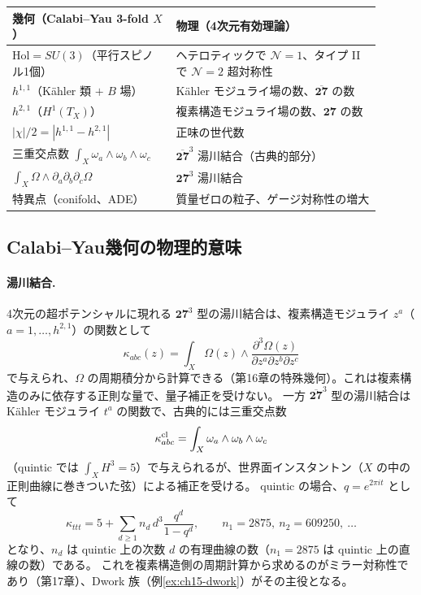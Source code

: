 \begin{physbox}[幾何と物理の辞書]
\begin{center}
\small\renewcommand{\arraystretch}{1.25}
\begin{tabular}{p{0.4\linewidth}|p{0.5\linewidth}}
幾何（Calabi--Yau 3-fold $X$）& 物理（4次元有効理論）\\ \hline
$\mathrm{Hol} = SU(3)$（平行スピノル1個）& ヘテロティックで $\mathcal N=1$、タイプ II で $\mathcal N=2$ 超対称性\\
$h^{1,1}$（K\"ahler 類 $+$ $B$ 場）& K\"ahler モジュライ場の数、$\overline{\mathbf{27}}$ の数\\
$h^{2,1}$（$H^1(T_X)$）& 複素構造モジュライ場の数、$\mathbf{27}$ の数\\
$|\chi|/2 = |h^{1,1}-h^{2,1}|$ & 正味の世代数\\
三重交点数 $\int_X\omega_a\wedge\omega_b\wedge\omega_c$ & $\overline{\mathbf{27}}^3$ 湯川結合（古典的部分）\\
$\int_X\Omega\wedge\partial_a\partial_b\partial_c\Omega$ & $\mathbf{27}^3$ 湯川結合\\
特異点（conifold、ADE）& 質量ゼロの粒子、ゲージ対称性の増大\\
\end{tabular}
\end{center}
\end{physbox}

\subsection{Calabi--Yau幾何の物理的意味}

\paragraph{湯川結合.}
4次元の超ポテンシャルに現れる $\mathbf{27}^3$ 型の湯川結合は、複素構造モジュライ $z^a$（$a=1,\dots,h^{2,1}$）の関数として
\[
\kappa_{abc}(z) = \int_X\Omega(z)\wedge\frac{\partial^3\Omega(z)}{\partial z^a\partial z^b\partial z^c}
\]
で与えられ、$\Omega$ の周期積分から計算できる（第16章の特殊幾何）。これは複素構造のみに依存する正則な量で、量子補正を受けない。
一方 $\overline{\mathbf{27}}^3$ 型の湯川結合は K\"ahler モジュライ $t^a$ の関数で、古典的には三重交点数
\[
\kappa_{abc}^{\rm cl} = \int_X\omega_a\wedge\omega_b\wedge\omega_c
\]
（quintic では $\int_XH^3 = 5$）で与えられるが、世界面インスタントン（$X$ の中の正則曲線に巻きついた弦）による補正を受ける。
quintic の場合、$q = e^{2\pi it}$ として
\[
\kappa_{ttt} = 5 + \sum_{d\geq1}n_d\,d^3\frac{q^d}{1-q^d},\qquad n_1 = 2875,\ n_2 = 609250,\ \dots
\]
となり、$n_d$ は quintic 上の次数 $d$ の有理曲線の数（$n_1 = 2875$ は quintic 上の直線の数）である。
これを複素構造側の周期計算から求めるのがミラー対称性であり（第17章）、Dwork 族（例\ref{ex:ch15-dwork}）がその主役となる。

